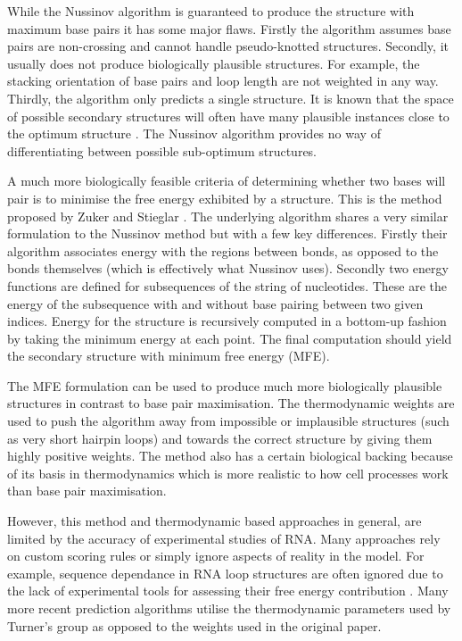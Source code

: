 \documentclass[journal]{IEEEtran}
\begin{document}
While the Nussinov algorithm is guaranteed to produce the structure with maximum base pairs it has some major flaws. Firstly the algorithm assumes base pairs are non-crossing and cannot handle pseudo-knotted structures. Secondly, it usually does not produce biologically plausible structures. For example, the stacking orientation of base pairs and loop length are not weighted in any way. Thirdly, the algorithm only predicts a single structure. It is known that the space of possible secondary structures will often have many plausible instances close to the optimum structure \cite{mccaskill1990equilibrium}. The Nussinov algorithm provides no way of differentiating between possible sub-optimum structures. 

A much more biologically feasible criteria of determining whether two bases will pair is to minimise the free energy exhibited by a structure. This is the method proposed by Zuker and Stieglar \cite{zuker1981optimal}. The underlying algorithm shares a very similar formulation to the Nussinov method but with a few key differences. Firstly their algorithm associates energy with the regions between bonds, as opposed to the bonds themselves (which is effectively what Nussinov uses). Secondly two energy functions are defined for subsequences of the string of nucleotides. These are the energy of the subsequence with and without base pairing between two given indices. Energy for the structure is recursively computed in a bottom-up fashion by taking the minimum energy at each point. The final computation should yield the secondary structure with minimum free energy (MFE).

The MFE formulation can be used to produce much more biologically plausible structures in contrast to base pair maximisation. The thermodynamic weights are used to push the algorithm away from impossible or implausible structures (such as very short hairpin loops) and towards the correct structure by giving them highly positive weights. The method also has a certain biological backing because of its basis in thermodynamics which is more realistic to how cell processes work than base pair maximisation. 

However, this method and thermodynamic based approaches in general, are limited by the accuracy of experimental studies of RNA. Many approaches rely on custom scoring rules or simply ignore aspects of reality in the model. For example, sequence dependance in RNA loop structures are often ignored due to the lack of experimental tools for assessing their free energy contribution \cite{do2006contrafold}. Many more recent prediction algorithms utilise the thermodynamic parameters used by Turner's group \cite{mathews1999expanded} as opposed to the weights used in the original paper. 
\end{document}
